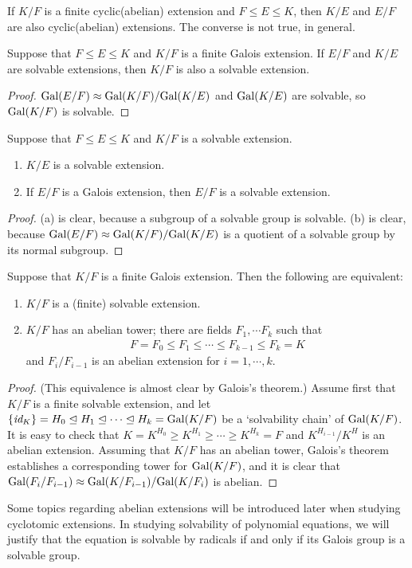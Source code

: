 \begin{obs}
    If $K/F$ is a finite cyclic(abelian) extension and $F\leq E\leq K$, then $K/E$ and $E/F$ are also cyclic(abelian) extensions.
    The converse is not true, in general.
\end{obs}
\begin{prop}
    Suppose that $F\leq E\leq K$ and $K/F$ is a finite Galois extension.
    If $E/F$ and $K/E$ are solvable extensions, then $K/F$ is also a solvable extension.
\end{prop}
\begin{proof}
    ${\textrm{Gal}({E/F})}\approx{{\textrm{Gal}({K/F})}}/{{\textrm{Gal}({K/E})}}$ and ${\textrm{Gal}({K/E})}$ are solvable, so ${\textrm{Gal}({K/F})}$ is solvable.
\end{proof}
\begin{prop}
    Suppose that $F\leq E\leq K$ and $K/F$ is a solvable extension.
    \begin{enumerate}
        \item[(a)]
        {
            $K/E$ is a solvable extension.
        }
        \item[(b)]
        {
            If $E/F$ is a Galois extension, then $E/F$ is a solvable extension.
        }
    \end{enumerate}
\end{prop}
\begin{proof}
    (a) is clear, because a subgroup of a solvable group is solvable.
    (b) is clear, because ${\textrm{Gal}({E/F})}\approx{{\textrm{Gal}({K/F})}}/{{\textrm{Gal}({K/E})}}$ is a quotient of a solvable group by its normal subgroup.
\end{proof}
\begin{prop}
    Suppose that $K/F$ is a finite Galois extension.
    Then the following are equivalent:
    \begin{enumerate}
        \item[(a)]
        {
            $K/F$ is a (finite) solvable extension.
        }
        \item[(b)]
        {
            $K/F$ has an abelian tower; there are fields $F_1, \cdots F_k$ such that
            \begin{align*}
                F=F_0\leq F_1\leq \cdots\leq F_{k-1}\leq F_k=K
            \end{align*}
            and $F_i/F_{i-1}$ is an abelian extension for $i=1, \cdots, k$.
        }
    \end{enumerate}
\end{prop}
\begin{proof}
    (This equivalence is almost clear by Galois's theorem.)
    Assume first that $K/F$ is a finite solvable extension, and let $\{\textit{id}_{K}\}=H_0\trianglelefteq H_1\trianglelefteq \cdots\trianglelefteq H_k={\textrm{Gal}({K/F})}$ be a `solvability chain' of ${\textrm{Gal}({K/F})}$.
    It is easy to check that $K=K^{H_0}\geq K^{H_1}\geq \cdots\geq K^{H_k}=F$ and $K^{H_{i-1}}/K^H$ is an abelian extension.
    Assuming that $K/F$ has an abelian tower, Galois's theorem establishes a corresponding tower for ${\textrm{Gal}({K/F})}$, and it is clear that ${\textrm{Gal}({F_i/F_{i-1}})}\approx{\textrm{Gal}({K/F_{i-1}})}/{\textrm{Gal}({K/F_i})}$ is abelian.
\end{proof}

Some topics regarding abelian extensions will be introduced later when studying cyclotomic extensions.
In studying solvability of polynomial equations, we will justify that the equation is solvable by radicals if and only if its Galois group is a solvable group.